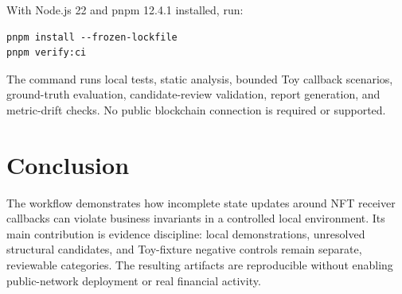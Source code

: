 \documentclass[11pt]{article}
\begin{document}
With Node.js 22 and pnpm 12.4.1 installed, run:

\begin{verbatim}
pnpm install --frozen-lockfile
pnpm verify:ci
\end{verbatim}

The command runs local tests, static analysis, bounded Toy callback scenarios, ground-truth evaluation, candidate-review validation, report generation, and metric-drift checks. No public blockchain connection is required or supported.

\section{Conclusion}

The workflow demonstrates how incomplete state updates around NFT receiver callbacks can violate business invariants in a controlled local environment. Its main contribution is evidence discipline: local demonstrations, unresolved structural candidates, and Toy-fixture negative controls remain separate, reviewable categories. The resulting artifacts are reproducible without enabling public-network deployment or real financial activity.
\end{document}
